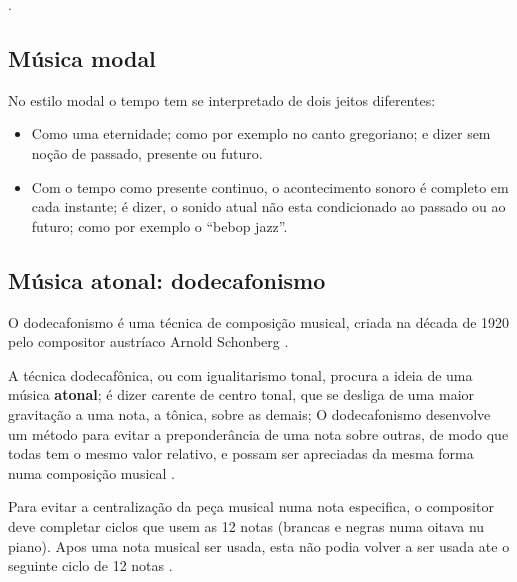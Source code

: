 .

\subsection{Música modal}
\label{sec:MusicaModal}

No estilo modal o tempo tem se interpretado de dois jeitos diferentes:
\begin{itemize}
\item Como uma eternidade; como por exemplo no canto gregoriano; e dizer 
sem noção de passado, presente ou futuro.
\item Com o tempo como presente continuo, 
o acontecimento sonoro é completo em cada instante; é dizer,
 o sonido atual não esta condicionado ao passado ou ao futuro;
como por exemplo o ``bebop jazz''\cite[pp. 156]{arbones2012armonia}.
\end{itemize}



\subsection{Música atonal: dodecafonismo}
\label{sec:MusicaAtonal}
O dodecafonismo é uma técnica de composição musical, 
criada na década de 1920 pelo compositor austríaco Arnold Schonberg \cite[pp. 121]{arbones2012armonia}\cite[pp. 263]{holst1998abc}.


A técnica dodecafônica, ou com igualitarismo tonal,
procura a ideia de uma música \textbf{atonal}; é dizer carente de centro tonal,
que se desliga de uma maior gravitação a uma nota, a tônica, sobre as demais;
O dodecafonismo desenvolve um método para evitar a preponderância de uma nota sobre outras,
de modo que todas tem o mesmo valor relativo,
e possam ser apreciadas da mesma forma numa composição musical 
\cite[pp. 122]{arbones2012armonia}.

Para evitar a centralização da peça musical numa nota especifica,
o compositor deve completar ciclos que usem as 12 notas 
(brancas e negras numa oitava nu piano). 
Apos uma nota musical ser usada, 
esta não podia volver a ser usada ate o seguinte ciclo de 12 notas \cite[pp. 123]{arbones2012armonia}.


